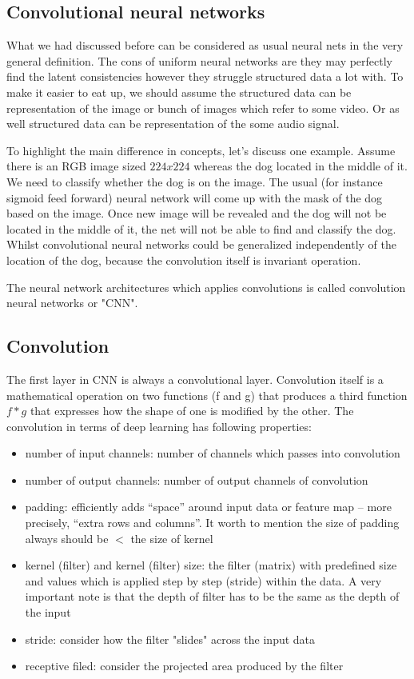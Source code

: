 \subsection{Convolutional neural networks}
What we had discussed before can be considered as usual neural nets in the very general definition. The cons of uniform neural networks are they may perfectly find the latent consistencies however they struggle structured data a lot with. To make it easier to eat up, we should assume the structured data can be representation of the image or bunch of images which refer to some video. Or as well structured data can be representation of the some audio signal.

To highlight the main difference in concepts, let's discuss one example.
Assume there is an RGB image sized $224x224$ whereas the dog located in the middle of it. We need to classify whether the dog is on the image. The usual (for instance sigmoid feed forward) neural network will come up with the mask of the dog based on the image. Once new image will be revealed and the dog will not be located in the middle of it, the net will not be able to find and classify the dog. Whilst convolutional neural networks could be generalized independently of the location of the dog, because the convolution itself is invariant operation.         

The neural network architectures which applies convolutions is called convolution neural networks or "CNN".    

\subsection{Convolution}
The first layer in CNN is always a convolutional layer. Convolution itself is a mathematical operation on two functions (f and g) that produces a third function $f*g$ that expresses how the shape of one is modified by the other. The convolution in terms of deep learning has following properties:  
\begin{itemize}
    \item number of input channels: number of channels which passes into convolution 
    \item number of output channels: number of output channels of convolution
    \item padding: efficiently adds “space” around input data or feature map – more precisely, “extra rows and columns”. It worth to mention the size of padding always should be $<$ the size of kernel 
    \item kernel (filter) and kernel (filter) size: the filter (matrix) with predefined size and values which is applied step by step (stride) within the data. A very important note is that the depth of filter has to be the same as the depth of the input
    \item stride: consider how the filter "slides" across the input data
    \item receptive filed: consider the projected area produced by the filter
\end{itemize}

